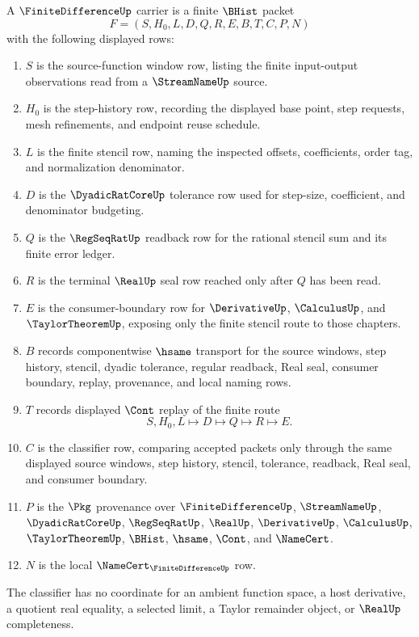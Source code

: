 \begin{definition}
\label{def:finite-difference-carrier}
A $\FiniteDifferenceUp$ carrier is a finite $\BHist$ packet
$$
F=(S,H_0,L,D,Q,R,E,B,T,C,P,N)
$$
with the following displayed rows:
\begin{enumerate}
\item $S$ is the source-function window row, listing the finite input-output observations read from a $\StreamNameUp$ source.
\item $H_0$ is the step-history row, recording the displayed base point, step requests, mesh refinements, and endpoint reuse schedule.
\item $L$ is the finite stencil row, naming the inspected offsets, coefficients, order tag, and normalization denominator.
\item $D$ is the $\DyadicRatCoreUp$ tolerance row used for step-size, coefficient, and denominator budgeting.
\item $Q$ is the $\RegSeqRatUp$ readback row for the rational stencil sum and its finite error ledger.
\item $R$ is the terminal $\RealUp$ seal row reached only after $Q$ has been read.
\item $E$ is the consumer-boundary row for $\DerivativeUp$, $\CalculusUp$, and $\TaylorTheoremUp$, exposing only the finite stencil route to those chapters.
\item $B$ records componentwise $\hsame$ transport for the source windows, step history, stencil, dyadic tolerance, regular readback, Real seal, consumer boundary, replay, provenance, and local naming rows.
\item $T$ records displayed $\Cont$ replay of the finite route
$$
S,H_0,L \longmapsto D \longmapsto Q \longmapsto R \longmapsto E .
$$
\item $C$ is the classifier row, comparing accepted packets only through the same displayed source windows, step history, stencil, tolerance, readback, Real seal, and consumer boundary.
\item $P$ is the $\Pkg$ provenance over $\FiniteDifferenceUp$, $\StreamNameUp$, $\DyadicRatCoreUp$, $\RegSeqRatUp$, $\RealUp$, $\DerivativeUp$, $\CalculusUp$, $\TaylorTheoremUp$, $\BHist$, $\hsame$, $\Cont$, and $\NameCert$.
\item $N$ is the local $\NameCert_{\FiniteDifferenceUp}$ row.
\end{enumerate}
The classifier has no coordinate for an ambient function space, a host derivative, a quotient real equality, a selected limit, a Taylor remainder object, or $\RealUp$ completeness.
\end{definition}

